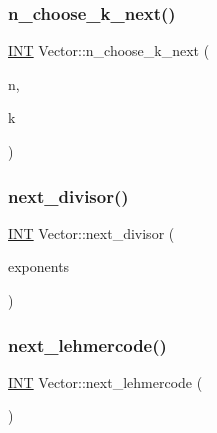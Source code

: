 \subsubsection{\texorpdfstring{n\+\_\+choose\+\_\+k\+\_\+next()}{n\_choose\_k\_next()}}
{\footnotesize\ttfamily \mbox{\hyperlink{galois_8h_a09fddde158a3a20bd2dcadb609de11dc}{I\+NT}} Vector\+::n\+\_\+choose\+\_\+k\+\_\+next (\begin{DoxyParamCaption}\item[{\mbox{\hyperlink{galois_8h_a09fddde158a3a20bd2dcadb609de11dc}{I\+NT}}}]{n,  }\item[{\mbox{\hyperlink{galois_8h_a09fddde158a3a20bd2dcadb609de11dc}{I\+NT}}}]{k }\end{DoxyParamCaption})}

\mbox{\label{class_vector_affee742a383eac1ff46a3313ae47dc76}} 
\subsubsection{\texorpdfstring{next\+\_\+divisor()}{next\_divisor()}}
{\footnotesize\ttfamily \mbox{\hyperlink{galois_8h_a09fddde158a3a20bd2dcadb609de11dc}{I\+NT}} Vector\+::next\+\_\+divisor (\begin{DoxyParamCaption}\item[{\mbox{\hyperlink{class_vector}{Vector}} \&}]{exponents }\end{DoxyParamCaption})}

\mbox{\label{class_vector_a0de9a2b5805b9bf0c53a24ad5e79f323}} 
\subsubsection{\texorpdfstring{next\+\_\+lehmercode()}{next\_lehmercode()}}
{\footnotesize\ttfamily \mbox{\hyperlink{galois_8h_a09fddde158a3a20bd2dcadb609de11dc}{I\+NT}} Vector\+::next\+\_\+lehmercode (\begin{DoxyParamCaption}{ }\end{DoxyParamCaption})}

\mbox{\label{class_vector_a965dd2d9e91fa94d4fc23cc1c34054f9}} 
